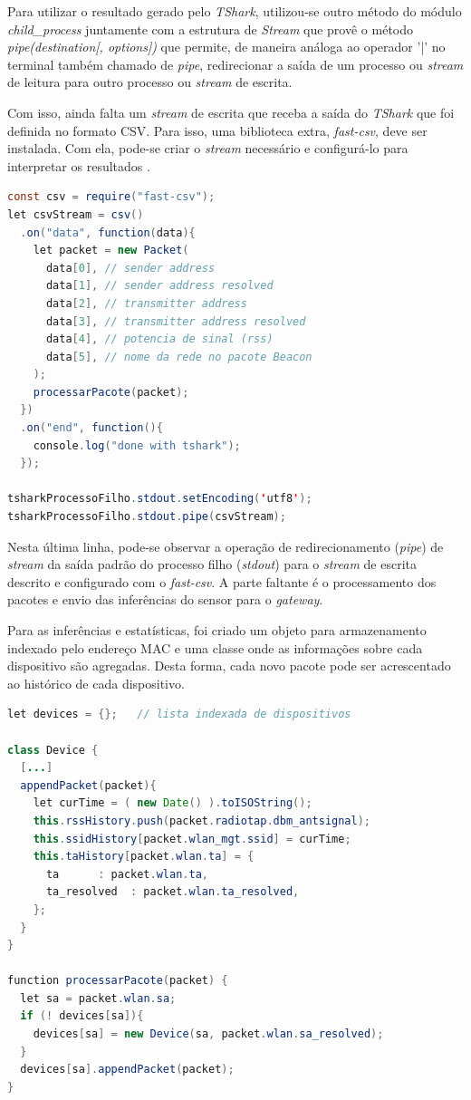 Para utilizar o resultado gerado pelo \emph{TShark}, utilizou-se outro método do
módulo \emph{child\_process} juntamente com a estrutura de \emph{Stream}
\cite{stream} que provê o método \emph{pipe(destination[, options])} que permite,
de maneira análoga ao operador '|' no terminal também chamado de \emph{pipe},
redirecionar a saída de um processo ou \emph{stream} de leitura para outro
processo ou \emph{stream} de escrita.

Com isso, ainda falta um \emph{stream} de escrita que receba a saída do
\emph{TShark} que foi definida no formato CSV. Para isso, uma biblioteca extra,
\emph{fast-csv}, deve ser instalada. Com ela, pode-se criar o \emph{stream}
necessário e configurá-lo para interpretar os resultados \cite{fast-csv}.

\begin{lstlisting}[language=java]
const csv = require("fast-csv");
let csvStream = csv()
  .on("data", function(data){
    let packet = new Packet(
      data[0], // sender address
      data[1], // sender address resolved
      data[2], // transmitter address
      data[3], // transmitter address resolved
      data[4], // potencia de sinal (rss)
      data[5], // nome da rede no pacote Beacon
    );
    processarPacote(packet);
  })
  .on("end", function(){
    console.log("done with tshark");
  });

tsharkProcessoFilho.stdout.setEncoding('utf8');
tsharkProcessoFilho.stdout.pipe(csvStream);
\end{lstlisting}

Nesta última linha, pode-se observar a operação de redirecionamento (\emph{pipe})
de \emph{stream} da saída padrão do processo filho (\emph{stdout}) para o
\emph{stream} de escrita descrito e configurado com o \emph{fast-csv}. A parte
faltante é o processamento dos pacotes e envio das inferências do sensor para o
\emph{gateway}.

Para as inferências e estatísticas, foi criado um objeto para armazenamento indexado
pelo endereço MAC e uma classe onde as informações
sobre cada dispositivo são agregadas. Desta forma, cada novo pacote pode ser acrescentado ao
histórico de cada dispositivo.

\begin{lstlisting}[language=java]
let devices = {};	// lista indexada de dispositivos

class Device {
  [...]
  appendPacket(packet){
    let curTime = ( new Date() ).toISOString();
    this.rssHistory.push(packet.radiotap.dbm_antsignal);
    this.ssidHistory[packet.wlan_mgt.ssid] = curTime;
    this.taHistory[packet.wlan.ta] = {
      ta      : packet.wlan.ta,
      ta_resolved  : packet.wlan.ta_resolved,
    };
  }
}

function processarPacote(packet) {
  let sa = packet.wlan.sa;
  if (! devices[sa]){
    devices[sa] = new Device(sa, packet.wlan.sa_resolved);
  }
  devices[sa].appendPacket(packet);
}
\end{lstlisting}

